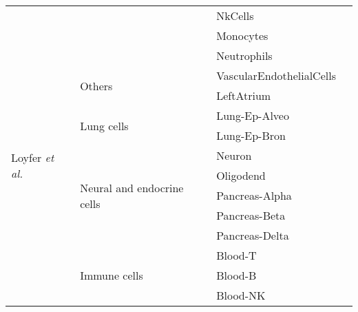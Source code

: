 \documentclass[12pt,letterpaper]{article}
\begin{document}
\begin{table}[htbp]
\begin{center}
\begin{tabular}{|l|l|l|l|}
            \cline{3-4}                             &                                             & NkCells                  &               \\
            \cline{3-4}                             &                                             & Monocytes                &               \\
            \cline{3-4}                             &                                             & Neutrophils              &               \\
            \cline{2-4}                             & \multirow{2}{*}{Others}                     & VascularEndothelialCells &               \\
            \cline{3-4}                             &                                             & LeftAtrium               &               \\
            \hline
            \multirow{6}{*}{Loyfer \textit{et al.}} & \multirow{2}{*}{Lung cells}                 & Lung-Ep-Alveo            &               \\
            \cline{3-4}                             &                                             & Lung-Ep-Bron             &               \\
            \cline{2-4}                             & \multirow{5}{*}{Neural and endocrine cells} & Neuron                   &               \\
            \cline{3-4}                             &                                             & Oligodend                &               \\
            \cline{3-4}                             &                                             & Pancreas-Alpha           &               \\
            \cline{3-4}                             &                                             & Pancreas-Beta            &               \\
            \cline{3-4}                             &                                             & Pancreas-Delta           &               \\
            \cline{2-4}                             & \multirow{5}{*}{Immune cells}               & Blood-T                  &               \\
            \cline{3-4}                             &                                             & Blood-B                  &               \\
            \cline{3-4}                             &                                             & Blood-NK                 &               \\

\end{tabular}
\end{center}
\end{table}
\end{document}
